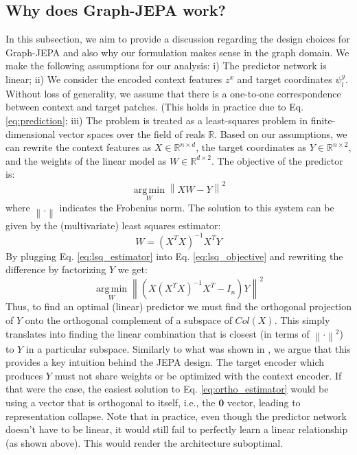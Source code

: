 \documentclass{article} \usepackage{iclr2024_conference,times}
\DeclareMathOperator*{\argmin}{arg\,min}
\begin{document}
\subsection{Why does Graph-JEPA work?} \label{met:formal_discussion}
In this subsection, we aim to provide a discussion regarding the design choices for Graph-JEPA and also why our formulation makes sense in the graph domain. We make the following assumptions for our analysis: i) The predictor network is linear; ii) We consider the encoded context features $z^x$ and target coordinates $\psi^y_l$. Without loss of generality, we assume that there is a one-to-one correspondence between context and target patches. (This holds in practice due to Eq. \ref{eq:prediction}; iii) The problem is treated as a least-squares problem in finite-dimensional vector spaces over the field of reals $\mathbb{R}$. Based on our assumptions, we can rewrite the context features as $X \in \mathbb{R}^{n \times d}$, the target coordinates as $Y \in \mathbb{R}^{n \times 2}$, and the weights of the linear model as $W \in \mathbb{R}^{d \times 2}$. The objective of the predictor is:
\begin{equation} \label{eq:lsq_objective}
   \argmin\limits_{W} \left\| XW - Y \right\|^2
\end{equation} 
where $\left\| . \right\|$ indicates the Frobenius norm. The solution to this system can be given by the (multivariate) least squares estimator:
\begin{equation} \label{eq:lsq_estimator}
    W = (X^TX)^{-1}X^TY
\end{equation}
By plugging Eq. \ref{eq:lsq_estimator} into Eq. \ref{eq:lsq_objective} and rewriting the difference by factorizing $Y$ we get:
\begin{equation} \label{eq:ortho_estimator}
   \argmin\limits_{W} \left\|  (X(X^TX)^{-1}X^T - I_n)Y \right\|^2
\end{equation}
Thus, to find an optimal (linear) predictor we must find the orthogonal projection of $Y$ onto the orthogonal complement of a subspace of $Col(X)$. This simply translates into finding the linear combination that is closest (in terms of $\left\| \cdot \right\|^2$) to $Y$ in a particular subspace. Similarly to what was shown in \citet{richemond2023edge}, we argue that this provides a key intuition behind the JEPA design. The target encoder which produces $Y$ must not share weights or be optimized with the context encoder. If that were the case, the easiest solution to Eq. \ref{eq:ortho_estimator} would be using a vector that is orthogonal to itself, i.e., the $\mathbf{0}$ vector, leading to representation collapse. Note that in practice, even though the predictor network doesn't have to be linear, it would still fail to perfectly learn a linear relationship (as shown above). This would render the architecture suboptimal. 
\end{document}
